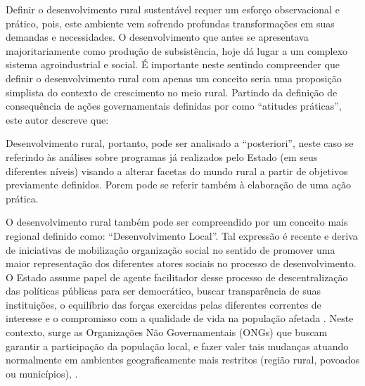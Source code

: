 Definir o desenvolvimento rural sustentável requer um esforço observacional e prático, pois, este ambiente vem sofrendo profundas transformações em suas demandas e necessidades. O desenvolvimento que antes se apresentava majoritariamente como produção de subsistência, hoje dá lugar a um complexo sistema agroindustrial \cite{bastos_determinantes_2018} e social. É importante neste sentindo compreender que definir o desenvolvimento rural com apenas um conceito seria uma proposição simplista do contexto de crescimento no meio rural. Partindo da definição de consequência de ações governamentais definidas por  como “atitudes práticas”, este autor descreve que:

\begin{citacao}
[...] Desenvolvimento rural, portanto, pode ser analisado a “posteriori”, neste caso se referindo às análises sobre programas já realizados pelo Estado (em seus diferentes níveis) visando a alterar facetas do mundo rural a partir de objetivos previamente definidos. Porem pode se referir também à elaboração de uma ação prática.
\end{citacao}

O desenvolvimento rural também pode ser compreendido por um conceito mais regional definido como: “Desenvolvimento Local”. Tal expressão é recente e deriva de iniciativas de mobilização organização social no sentido de promover uma maior representação dos diferentes atores sociais no processo de desenvolvimento. O Estado assume papel de agente facilitador desse processo de descentralização das políticas públicas para ser democrático, buscar transparência de suas instituições, o equilíbrio das forças exercidas pelas diferentes correntes de interesse e o compromisso com a qualidade de vida na população afetada \cite{castro_agricultura_2017}.
 Neste contexto, surge as Organizações Não Governamentais (ONGs) que buscam garantir a participação da população local, e fazer valer tais mudanças atuando normalmente em ambientes geograficamente mais restritos (região rural, povoados ou municípios), \cite{assis_agricultura_2005, teixeira_o_2016}.